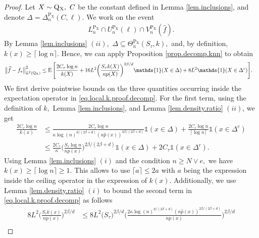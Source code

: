 \documentclass[10pt]{article}
\newcommand{\E}{\operatorname{E}}
\renewcommand{\P}{\operatorname{P}}
\newcommand{\Q}{\operatorname{Q}}
\renewcommand{\k}{\kappa}
\newcommand{\wh}{\widehat}
\newcommand{\sX}{\mathrm{X}}
\begin{document}
\begin{proof}
    Let $X \sim \Q\mathstrut_{\!\sX}, \ C$ be the constant defined in Lemma \ref{lem.inclusions}, and denote $\Delta = \Delta_n^{\P_{\sX}}(C, \ell).$ We work on the event 
    \begin{align}
        \label{eq.event.local.knn}
        L_n^{\P_{\sX}}\cap U_n^{\P_{\sX}}(\ell)\cap V_n^{\P_{\sX}}(\wh f).
    \end{align}
    By Lemma \ref{lem.inclusions} $(ii),$ $\Delta \subseteq \Theta_n^{\P_{\sX}}(S_\tau, k),$ and, by definition, $k(x) \geq \lceil \log n\rceil$. Hence, we can apply Proposition \ref{prop.decomp.knn} to obtain
    \begin{align}
        \label{eq.local.k.proof.decomp}
        \big\|\wh f - f_*\big\|_{L^2(\Q\mathstrut_{\!\sX})}^2 &\leq \E\Bigg[\frac{2C_\tau\log n}{k(X)} + 16L^2\bigg(\frac{S_\tau k(X)}{np(X)}\bigg)^{2\beta/d}\mathds{1}(X \in \Delta) + 8L^2\mathds{1}(X \in \Delta^c)\Bigg].
    \end{align}
    We first derive pointwise bounds on the three quantities occurring inside the expectation operator in \eqref{eq.local.k.proof.decomp}. For the first term, using the definition of $k,$ Lemma \ref{lem.inclusions}, and Lemma \ref{lem.density.ratio} $(ii)$, we get
    \begin{align}
        \label{eq.local.one.sample.pointwise.variance.bound}
        \frac{2C_\tau\log n}{k(x)} &\leq  \frac{2C_\tau\log n}{\kappa \log(n)^{d/(2\beta + d)} (n \wh p(x))^{2\beta/(2\beta + d)}}\mathds{1}(x \in \Delta) +  \frac{2C_\tau\log n}{\lceil \log n\rceil}\mathds{1}(x \in \Delta^c)\nonumber\\
        &\leq \frac{2C_\tau}{\k}\bigg(\frac{S_\tau \log n}{np(x)}\bigg)^{2\beta/(2\beta + d)}\mathds{1}(x \in \Delta) + 2C_\tau\mathds{1}(x \in \Delta^c).
    \end{align}
    Using Lemma \ref{lem.inclusions} $(i)$ and the condition $n \geq N\vee e,$ we have $k(x) \geq \lceil \log n\rceil \geq 1.$ This allows to use $\lceil a \rceil \leq 2a$ with $a$ being the expression inside the ceiling operator in the expression of $k(x).$ Additionally, we use Lemma \ref{lem.density.ratio} $(i)$ to bound the second term in \eqref{eq.local.k.proof.decomp} as follows
    \begin{align}
        \label{eq.local.one.sample.pointwise.bias.hd.bound}
        8L^2\bigg(\frac{S_\tau k(x)}{np(x)}\bigg)^{2\beta/d} & \leq 8L^2\big(S_\tau\big)^{2\beta/d}\bigg(\frac{2\k\log(n)^{d/(2\beta + d)}(n\wh p(x))^{2\beta/ (2\beta + d)}}{np(x)}\bigg)^{2\beta/d} \nonumber\\

\end{align}
\end{proof}
\end{document}
